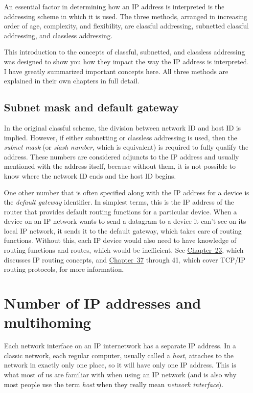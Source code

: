 \begin{keyconcept}
An essential factor in determining how an IP address is interpreted is the addressing scheme in which it is used.
The three methods, arranged in increasing order of age, complexity, and flexibility, are classful addressing, subnetted classful addressing, and classless addressing.
\end{keyconcept}

This introduction to the concepts of classful, subnetted, and classless
addressing was designed to show you how they impact the way the IP
address is interpreted. I have greatly summarized important concepts
here. All three methods are explained in their own chapters in full
detail.




\subsection{Subnet mask and default gateway}

In the original classful scheme, the division between network ID and host ID is
implied.
However, if either subnetting or classless addressing is used, then the {\emph{subnet mask}} (or {\emph{slash number}}, which is equivalent) is required to fully qualify the address.
These numbers are considered adjuncts to the IP address and usually mentioned with the address itself, because without them, it is not possible to know where the network ID ends and the host ID begins.

One other number that is often specified along with the IP address for a device is the \emph{default gateway} identifier.
In simplest terms, this is the IP address of the
router that provides default routing functions for a particular device.
When a device on an IP network wants to send a datagram to a device it
can't see on its local IP network, it sends it to the default gateway,
which takes care of routing functions. Without this, each IP device
would also need to have knowledge of routing functions and routes, which
would be inefficient. See \protect\hyperlink{ch23.html}{Chapter~23},
which discusses IP routing concepts, and
\protect\hyperlink{ch37.html}{Chapter~37} through 41, which cover TCP/IP
routing protocols, for more information.


\section{Number of IP addresses and multihoming}
Each network interface on an IP internetwork has a separate IP address.
In a classic network, each regular computer, usually called a
\emph{host}, attaches to the network in exactly only one place, so it
will have only one IP address. This is what most of us are familiar with
when using an IP network (and is also why most people use the term
\emph{host} when they really mean {\emph{network interface}}).


